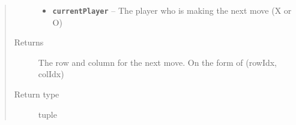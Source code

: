 \documentclass[letterpaper,10pt,english]{sphinxmanual}
\begin{document}
\begin{fulllineitems}
\begin{fulllineitems}
\begin{quote}
\begin{description}
\begin{itemize}
\item {} 
\textbf{\texttt{currentPlayer}} -- The player who is making the next move (X or O)

\end{itemize}

\item[{Returns}] \leavevmode
The row and column for the next move. On the form of (rowIdx, colIdx)

\item[{Return type}] \leavevmode
tuple

\end{description}\end{quote}

\end{fulllineitems}


\end{fulllineitems}

\label{index:module-AI}
\end{document}
